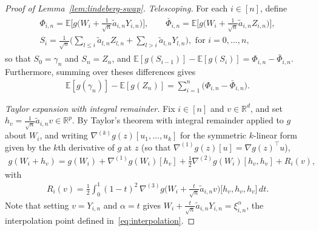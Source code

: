 \documentclass[10pt,a4paper]{amsart}
\newcommand{\Ee}{{\mathbb{E}}}
\newcommand{\real}{\mathbb{R}}
\begin{document}
\begin{proof}[Proof of Lemma~\ref{lem:lindeberg-swap}]
\textit{Telescoping.}
For each $i\in[n]$, define
\begin{align*}
\begin{gathered}
  \Phi_{i,n}
  =\Ee\Big[g\Big(W_i+\tfrac{1}{\sqrt n}\widetilde a_{i,n}Y_{i,n}\Big)\Big],
  \qquad
  \bar\Phi_{i,n}
  =\Ee\Big[g\Big(W_i+\tfrac{1}{\sqrt n}\widetilde a_{i,n}Z_{i,n}\Big)\Big],\\
  S_i=\frac{1}{\sqrt n}\big(\sum_{l\le i}\widetilde a_{l,n}Z_{l,n}
+\sum_{l>i}\widetilde a_{l,n}Y_{l,n}\big), \text{ for  } i=0,\dots,n,
\end{gathered}
\end{align*}
so that
$S_0=\gamma_n$ and $S_n=Z_n$, and 
$\Ee[g(S_{i-1})]-\Ee[g(S_i)]=\Phi_{i,n}-\bar\Phi_{i,n}$.
Furthermore, summing over theses differences gives
\begin{align}
  \label{eq:telescope}
  \Ee[g(\gamma_n)]-\Ee[g(Z_n)]
  =\sum_{i=1}^n\big(\Phi_{i,n}-\bar\Phi_{i,n}\big).
\end{align}

\medskip\noindent\textit{Taylor expansion with integral remainder.}
Fix $i\in[n]$ and $v\in\real^d$, and set $h_v=\tfrac{1}{\sqrt n}\widetilde a_{i,n}v\in\real^p$. 
By Taylor's theorem with integral remainder applied to $g$ about $W_i$, and writing $\nabla^{(k)}g(z)[u_1,\dots,u_k]$ for the symmetric $k$-linear form given by the $k$th derivative of $g$ at $z$ (so that $\nabla^{(1)}g(z)[u]=\nabla g(z)^\top u$),
\begin{align}
  \label{eq:taylor}
  g(W_i+h_v)
  =g(W_i)+\nabla^{(1)}g(W_i)[h_v]
   +\tfrac12\nabla^{(2)}g(W_i)[h_v,h_v]+R_i(v),
\end{align}
with
\begin{align}
  \label{eq:remainder}
  R_i(v)
  =\frac12\int_0^1(1-t)^2\,
   \nabla^{(3)}g\Big(W_i+\tfrac{t}{\sqrt n}\widetilde a_{i,n}v\Big)
   \big[h_v,h_v,h_v\big]\,dt.
\end{align}
Note that setting $v=Y_{i,n}$ and $\alpha=t$ gives
$W_i+\tfrac{t}{\sqrt n}\widetilde a_{i,n}Y_{i,n}=\xi^{\alpha}_{i,n}$,
the interpolation point defined in~\eqref{eq:interpolation}.


\end{proof}
\end{document}
